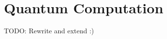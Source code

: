 %
%


\chapter{Quantum Computation}
\label{chap:quantum-computation}

{\color{red} TODO: Rewrite and extend :)}


